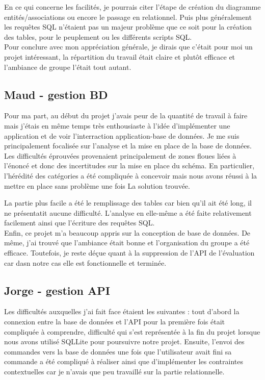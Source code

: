 \documentclass[10pt, a4paper]{article}
\begin{document}
En ce qui concerne les facilités, je pourrais citer l'étape de création du diagramme
entités/associations ou encore le passage en relationnel. Puis plus généralement les requêtes
SQL n'étaient pas un majeur problème que ce soit pour la création des tables, pour le
peuplement ou les différents scripts SQL.\\

Pour conclure avec mon appréciation générale, je dirais que c'était pour moi un projet
intéressant, la répartition du travail était claire et plutôt efficace et l'ambiance de groupe
l'était tout autant.

\subsection{Maud - gestion BD}
Pour ma part, au début du projet j'avais peur de la quantité de travail à faire mais j'étais
en même temps très enthousiaste à l'idée d'implémenter une application et de voir l'interraction
application-base de données. Je me suis principalement focalisée sur l'analyse et la mise en
place de la base de données.\\

Les difficultés éprouvées provenaient principalement de zones floues liées à l'énoncé et donc
des incertitudes sur la mise en place du schéma. En particulier, l'hérédité des catégories a été
compliquée à concevoir mais nous avons réussi à la mettre en place sans problème une fois La
solution trouvée.

La partie plus facile a été le remplissage des tables car bien qu'il ait été long, il ne
présentatit aucune difficulté. L'analyse en elle-même a été faite relativement facilement
ainsi que l'écriture des requêtes SQL.\\

Enfin, ce projet m'a beaucoup appris sur la conception de base de données. De même, j'ai trouvé
que l'ambiance était bonne et l'organisation du groupe a été efficace. Toutefois, je reste déçue
quant à la suppression de l'API de l'évaluation car dasn notre cas elle est fonctionnelle et terminée.

\subsection{Jorge - gestion API}
Les difficultés auxquelles j'ai fait face étaient les suivantes : tout d'abord la connexion entre la base de données
et l'API pour la première fois était compliquée à comprendre, difficulté qui s'est représentée
à la fin du projet lorsque nous avons utilisé SQLLite pour poursuivre notre projet. Ensuite,
l'envoi des commandes vers la base de données une fois que l'utilisateur avait fini sa commande
a été compliqué à réaliser ainsi que d'implémenter les contraintes contextuelles car je
n'avais que peu travaillé sur la partie relationnelle. \\
\end{document}
